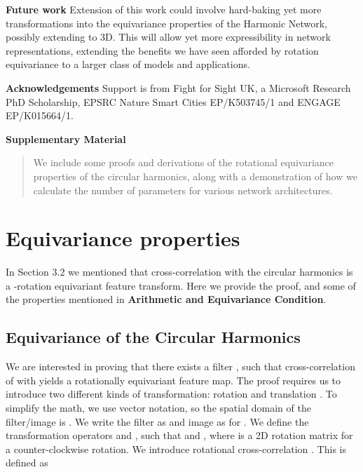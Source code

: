 \documentclass[10pt,twocolumn,letterpaper]{article}
\newcommand{\bb}[1]{\textbf{#1}}
\begin{document}
\textbf{Future work}
Extension of this work could involve hard-baking yet more transformations into the equivariance properties of the Harmonic Network, possibly extending to 3D. This will allow yet more expressibility in network representations, extending the benefits we have seen afforded by rotation equivariance to a larger class of models and applications.

\textbf{Acknowledgements}
Support is from Fight for Sight UK, a Microsoft Research PhD Scholarship, EPSRC Nature Smart Cities EP/K503745/1 and ENGAGE EP/K015664/1.

{\small


}

\newpage
\onecolumn
\appendix
\begin{center}
\Large
\textbf{Supplementary Material}
\end{center}


\begin{abstract}
	We include some proofs and derivations of the rotational equivariance
    properties of the circular harmonics, along with a demonstration of how
    we calculate the number of parameters for various network architectures.
\end{abstract}



\section{Equivariance properties}
In Section 3.2 we mentioned that cross-correlation with the circular harmonics
is a -rotation equivariant feature transform. Here we provide the proof,
and some of the properties mentioned in \bb{Arithmetic and Equivariance Condition}.

\subsection{Equivariance of the Circular Harmonics}
We are interested in proving that there exists a filter , such that cross-correlation of  with  yields a rotationally equivariant feature map. The proof requires us to introduce two different kinds of transformation: rotation  and translation . To simplify the math, we use vector notation, so the spatial domain of the filter/image is . We write the filter as  and image as  for . We define the transformation operators  and , such that  and , where  is a 2D rotation matrix for a  counter-clockwise rotation. We introduce rotational cross-correlation . This is defined as
\end{document}
